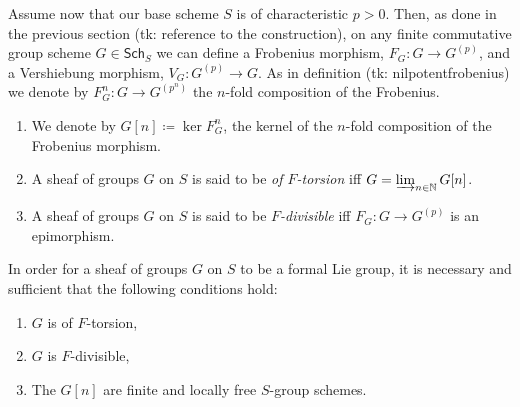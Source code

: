 \documentclass[../Main]{subfiles}
\begin{document}
Assume now that our base scheme $S$ is of characteristic $p  > 0$.
Then, as done in the previous section (tk: reference to the construction),
on any finite commutative group scheme 
$G \in \mathsf{Sch}_{ S }$ we can define a Frobenius morphism,
$F_G\colon G \to G^{(p)}$, and a Vershiebung morphism, $V_G \colon G^{(p)} \to G$.
As in definition (tk: nilpotentfrobenius) we denote by 
$F^n_G\colon G \to G^{(p^n)}$ the $n$-fold composition
of the Frobenius.

\begin{defn}[]\leavevmode\vspace{-.2\baselineskip}
\begin{enumerate}
\item We denote by $G[n] \coloneqq \ker F^n_G$, the kernel of the $n$-fold composition
	of the Frobenius morphism.
	
\item A sheaf of groups $G$ on $S$ is said to be {\em of $F$-torsion} iff
	$G = \varinjlim_{n \in \mathbb{N}} G[n]$.

\item A sheaf of groups $G$ on $S$ is said to be {\em $F$-divisible} iff
	$F_G\colon G \to G^{(p)}$ is an epimorphism.
\end{enumerate}
\end{defn}


\begin{thm}
	In order for a sheaf of groups $G$ on $S$ to be a formal Lie group, 
	it is necessary and sufficient that the following conditions hold:
\begin{enumerate}
	\item $G$ is of $F$-torsion,
	\item $G$ is $F$-divisible,
	\item The $G[n]$ are finite and locally free $S$-group schemes.
\end{enumerate}
\end{thm}
\end{document}
